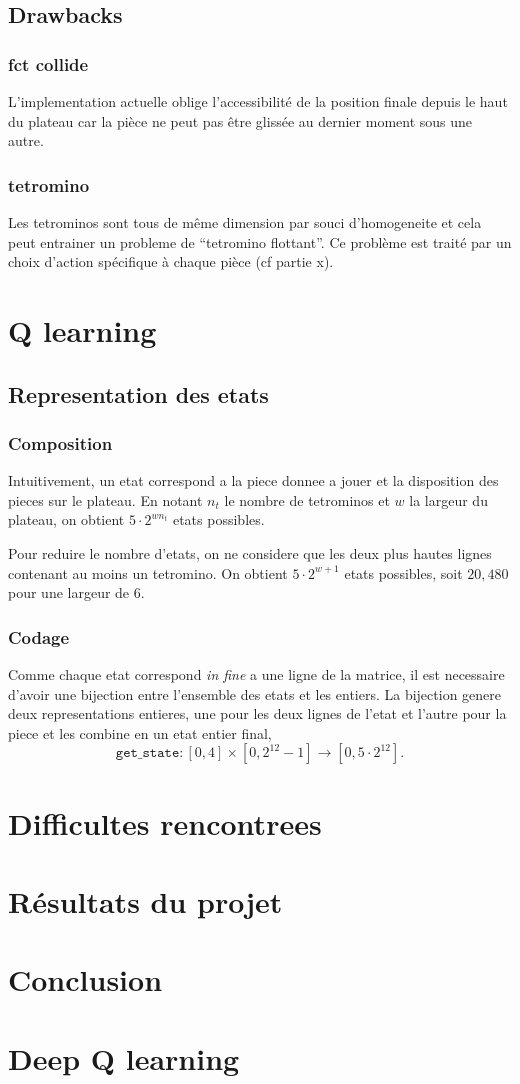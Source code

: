 \documentclass{article}
\begin{document}
\subsection{Drawbacks}
\subsubsection{fct collide}
L'implementation actuelle oblige l'accessibilit\'e de la position finale depuis
le haut du plateau car la pi\`ece ne peut pas \^etre gliss\'ee au dernier moment
sous une autre.
\subsubsection{tetromino}
Les tetrominos sont tous de même dimension par souci d'homogeneite et cela
peut entrainer un probleme de ``tetromino flottant''. Ce problème est traité par
un choix d'action spécifique à chaque pièce (cf partie x).
\section{Q learning}

\subsection{Representation des etats}
\subsubsection{Composition}
Intuitivement, un etat correspond a la piece donnee a jouer et la disposition
des pieces sur le plateau. En notant \(n_t\) le nombre de tetrominos et \(w\) la
largeur du plateau, on obtient \(5 \cdot 2^{wn_t}\) etats possibles.

Pour reduire le nombre d'etats, on ne considere que les deux plus hautes lignes
contenant au moins un tetromino. On obtient \(5\cdot 2^{w+1}\) etats possibles,
soit \(20,480\) pour une largeur de 6.

\subsubsection{Codage}
Comme chaque etat correspond \textit{in fine} a une ligne de la matrice, il est
necessaire d'avoir une bijection entre l'ensemble des etats et les entiers. La
bijection genere deux representations entieres, une pour les deux lignes de
l'etat et l'autre pour la piece et les combine en un etat entier final,
\[
  \texttt{get\_state}\colon [0,4]\times [0, 2^{12} - 1] \to [0, 5\cdot 2^{12}].
\]

\section{Difficultes rencontrees}

\section{R\'esultats du projet}

\section*{Conclusion}

\appendix
\section{Deep Q learning}
\end{document}
